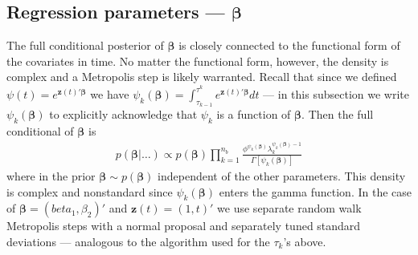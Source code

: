 \documentclass{article}
\begin{document}
\subsection{Regression parameters --- $\bm{\beta}$}
The full conditional posterior of $\bm{\beta}$ is closely connected to the functional form of the covariates in time. No matter the functional form, however, the density is complex and a Metropolis step is likely warranted. Recall that since we defined $\psi(t) = e^{\bm{z}(t)'\bm{\beta}}$ we have $\psi_k(\bm{\beta}) = \int_{\tau_{k-1}}^{\tau^k}e^{\bm{z}(t)'\bm{\beta}}dt$ --- in this subsection we write $\psi_k(\bm{\beta})$ to explicitly acknowledge that $\psi_k$ is a function of $\bm{\beta}$. Then the full conditional of $\bm{\beta}$ is
\begin{align*}
p(\bm{\beta}|\dots) \propto p(\bm{\beta})\prod_{k=1}^{n_b}\frac{\phi^{\psi_k(\bm{\beta})}\lambda_k^{\psi_k(\bm{\beta}) - 1}}{\Gamma[\psi_k(\bm{\beta})]}
\end{align*}
where in the prior $\bm{\beta} \sim p(\bm{\beta})$ independent of the other parameters. This density is complex and nonstandard since $\psi_k(\bm{\beta})$ enters the gamma function. In the case of $\bm{\beta} = (beta_1, \beta_2)'$ and $\bm{z}(t) = (1, t)'$ we use separate random walk Metropolis steps with a normal proposal and separately tuned standard deviations --- analogous to the algorithm used for the $\tau_k$'s above.
\end{document}
